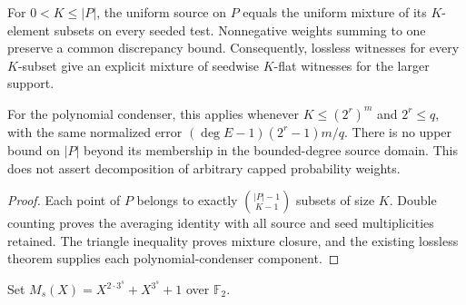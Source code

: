 \begin{theorem}
  \label{thm:lowerbounds-algebraic-lossless-mixture}
  \leanok
  For $0<K\le |P|$, the uniform source on $P$ equals the uniform
  mixture of its $K$-element subsets on every seeded test. Nonnegative
  weights summing to one preserve a common discrepancy bound.
  Consequently, lossless witnesses for every $K$-subset give an explicit
  mixture of seedwise $K$-flat witnesses for the larger support.

  For the polynomial condenser, this applies whenever $K\le(2^r)^m$
  and $2^r\le q$, with the same normalized error
  $(\deg E-1)(2^r-1)m/q$. There is no upper bound on $|P|$ beyond
  its membership in the bounded-degree source domain. This does not
  assert decomposition of arbitrary capped probability weights.
\end{theorem}
\begin{proof}
  \leanok
  Each point of $P$ belongs to exactly $\binom{|P|-1}{K-1}$ subsets
  of size $K$. Double counting proves the averaging identity with
  all source and seed multiplicities retained. The triangle inequality
  proves mixture closure, and the existing lossless theorem supplies
  each polynomial-condenser component.
\end{proof}

\begin{definition}
  \label{def:lowerbounds-algebraic-binary-modulus}
  \leanok
  Set $M_s(X)=X^{2\cdot3^s}+X^{3^s}+1$ over $\mathbb F_2$.
\end{definition}

